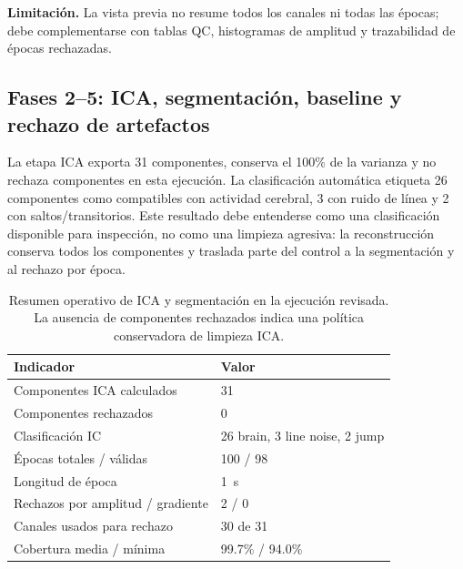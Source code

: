 \textbf{Limitación.} La vista previa no resume todos los canales ni todas las épocas; debe complementarse con tablas QC, histogramas de amplitud y trazabilidad de épocas rechazadas.

\subsection{Fases 2--5: ICA, segmentación, baseline y rechazo de artefactos}

La etapa ICA exporta 31 componentes, conserva el 100\% de la varianza y no rechaza componentes en esta ejecución. La clasificación automática etiqueta 26 componentes como compatibles con actividad cerebral, 3 con ruido de línea y 2 con saltos/transitorios. Este resultado debe entenderse como una clasificación disponible para inspección, no como una limpieza agresiva: la reconstrucción conserva todos los componentes y traslada parte del control a la segmentación y al rechazo por época.

\begin{table}[H]
\centering
\caption{Resumen operativo de ICA y segmentación en la ejecución revisada. La ausencia de componentes rechazados indica una política conservadora de limpieza ICA.}
\label{tab:results-ica-segmentation}
\begin{tabular}{ll}
\toprule
\textbf{Indicador} & \textbf{Valor} \\
\midrule
Componentes ICA calculados & 31 \\
Componentes rechazados & 0 \\
Clasificación IC & 26 brain, 3 line noise, 2 jump \\
Épocas totales / válidas & 100 / 98 \\
Longitud de época & \SI{1}{s} \\
Rechazos por amplitud / gradiente & 2 / 0 \\
Canales usados para rechazo & 30 de 31 \\
Cobertura media / mínima & 99.7\% / 94.0\% \\
\bottomrule
\end{tabular}
\end{table}

